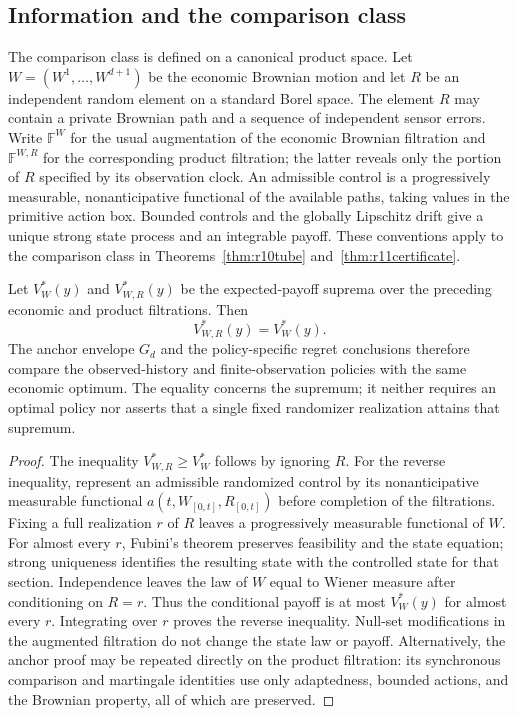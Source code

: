 \subsection{Information and the comparison class}\label{sec:r14filtration}
The comparison class is defined on a canonical product space. Let
$W=(W^1,\ldots,W^{d+1})$ be the economic Brownian motion and let $R$ be
an independent random element on a standard Borel space. The element $R$
may contain a private Brownian path and a sequence of independent sensor
errors. Write $\mathbb F^W$ for the usual augmentation of the economic
Brownian filtration and $\mathbb F^{W,R}$ for the corresponding product
filtration; the latter reveals only the portion of $R$ specified by its
observation clock. An admissible control is a progressively measurable,
nonanticipative functional of the available paths, taking values in the
primitive action box. Bounded controls and the globally Lipschitz drift
give a unique strong state process and an integrable payoff. These
conventions apply to the comparison class in
Theorems~\ref{thm:r10tube} and~\ref{thm:r11certificate}.

\begin{proposition}
\label{prop:r14randomization}
Let $V_W^*(y)$ and $V_{W,R}^*(y)$ be the expected-payoff suprema over the
preceding economic and product filtrations. Then
\[
                 V_{W,R}^*(y)=V_W^*(y).
\]
The anchor envelope $G_d$ and the policy-specific regret conclusions
therefore compare the observed-history and finite-observation policies
with the same economic optimum. The equality concerns the supremum;
it neither requires an optimal policy nor asserts that a single fixed
randomizer realization attains that supremum.
\end{proposition}

\begin{proof}
The inequality $V_{W,R}^*\geq V_W^*$ follows by ignoring $R$. For the
reverse inequality, represent an admissible randomized control by its
nonanticipative measurable functional $a(t,W_{[0,t]},R_{[0,t]})$ before
completion of the filtrations. Fixing a full realization $r$ of $R$
leaves a progressively measurable functional of $W$. For almost every
$r$, Fubini's theorem preserves feasibility and the state equation;
strong uniqueness identifies the resulting state with the controlled
state for that section. Independence leaves the law of $W$ equal to
Wiener measure after conditioning on $R=r$. Thus the conditional payoff
is at most $V_W^*(y)$ for almost every $r$. Integrating over $r$ proves
the reverse inequality. Null-set modifications in the augmented
filtration do not change the state law or payoff. Alternatively, the
anchor proof may be repeated directly on the product filtration: its
synchronous comparison and martingale identities use only adaptedness,
bounded actions, and the Brownian property, all of which are preserved.
\end{proof}

